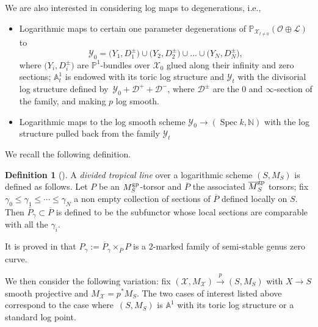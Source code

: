 \documentclass[pdftex]{sigma}
\renewcommand{\L}{\mathcal{L}}
\newcommand{\X}{\mathcal{X}}
\renewcommand{\O}{\mathcal{O}}
\newcommand{\Y}{\mathcal{Y}}
\renewcommand{\leq}{\leqslant}
\renewcommand{\bar}{\overline}
\numberwithin{equation}{section}
\theoremstyle{definition}
\newtheorem{defi}[theo]{Definition}
\begin{document}
We are also interested in considering log maps to degenerations, i.e.,
\begin{itemize}\itemsep=0pt
\item Logarithmic maps to \smash{$\Y_t\xrightarrow{p}\mathbb A^1_t$} certain one parameter degenerations of $\mathbb P_{\X_{t\neq 0}}(\O\oplus\L)$ to
\[\Y_0=\bigl(Y_1,D_1^\pm\bigr)\cup\bigl(Y_2,D_2^\pm\bigr)\cup\dots\cup \bigl(Y_N,D_N^\pm\bigr),
\]
where $\bigl(Y_i,D^{\pm}_i\bigr)$ are $\mathbb P^1$-bundles over $\X_0$ glued along their infinity and zero sections;
$\mathbb A^1_t$ is endowed with its toric log structure and $\Y_t$ with the divisorial log structure defined by~${\Y_0+\mathcal{D}^+ +\mathcal{D}^-}$, where $\mathcal{D}^\pm$ are the $0$ and $\infty$-section of the family, and making $p$ log smooth.
\item Logarithmic maps to the log smooth scheme $\Y_0\to(\operatorname{Spec} k,\mathbb N)$ with the log structure pulled back from the family $\Y_t$
\end{itemize}

We recall the following definition.

\begin{defi}[{\cite[Definition~5.2.1]{marcuswiselog}}]
 A \emph{divided tropical line} over a logarithmic scheme $(S,M_S)$ is defined as follows. Let $P$ be an $M_S^{\rm gp}$-torsor and $\bar{P}$ the associated $\bar{M}_S^{\rm gp}$ torsors; fix $\gamma_0\leq\gamma_1\leq\cdots\leq\gamma_N$ a non empty collection of sections of $\bar{P}$ defined locally on $S$. Then $\bar{P}_{\gamma}\subset\bar{P}$ is defined to be the subfunctor whose local sections are comparable with all the $\gamma_i$.
\end{defi}
It is proved in \cite[Proposition~5.2.4]{marcuswiselog} that $P_{\gamma}:=\bar{P}_{\gamma}\times_{\bar{P}} P$ is a 2-marked family of semi-stable genus zero curve.



We then consider the following variation: fix $(\mathcal X, M_{\X})\xrightarrow{p} (S,M_S)$ with $X\to S$ smooth projective and $M_{\X}=p^*M_S$.
The two cases of interest listed above correspond to the case where~$(S,M_S)$ is $\mathbb A^1$ with its toric log structure or a standard log point.
\end{document}
